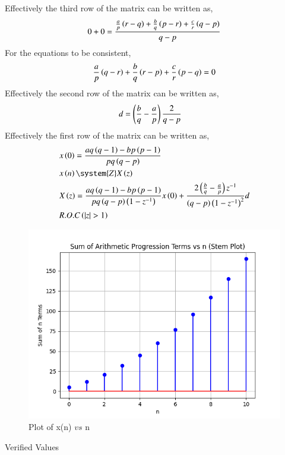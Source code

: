 \documentclass[journal,12pt,twocolumn]{IEEEtran}
\theoremstyle{remark}
\begin{document}
Effectively the third row of the matrix can be written as,
\begin{align}
    0+0=\frac{\frac{a}{p}\left(r-q\right)+\frac{b}{q}\left(p-r\right)+\frac{c}{r}\left(q-p\right)}{q-p}
\end{align}
For the equations to be consistent,
\begin{align}
    {\frac{a}{p}\ensuremath{\left(q-r\right)}+\frac{b}{q}\ensuremath{\left(r-p\right)}+\frac{c}{r}\ensuremath{\left(p-q\right)}}=0
\end{align}
Effectively the second row of the matrix can be written as,
\begin{align}
    &d=\left(\frac{b}{q}-\frac{a}{p}\right)\frac{2}{q-p}
\end{align}
Effectively the first row of the matrix can be written as,
\begin{align}
    &x\brak{0}=\frac{aq\brak{q-1}-bp\brak{p-1}}{pq\brak{q-p}}\\
    &x \brak{n} \system{Z} X \brak{z}\\
    &X\brak{z}=\frac{aq\brak{q-1}-bp\brak{p-1}}{pq\brak{q-p}\brak{1-z^{-1}}}x\brak{0}+\frac{2\brak{\frac{b}{q}-\frac{a}{p}}z^{-1}}{\brak{q-p}\brak{1-z^{-1}}^{2}}d\\
    &R.O.C\brak{|z|>1}
\end{align}
\begin{figure}[ht]
    \centering
    \includegraphics[width=\columnwidth]{figs/Figure_1.png}
    \caption{Plot of x(n) $vs$ n}
    \label{fig:11.9.2.11.2}
\end{figure}
\begin{table}[ht]
    \centering
    \def\arraystretch{1.5}
    
    \caption{Verified Values}
    \label{tab:11.9.2.11.3}
\end{table}
\end{document}
